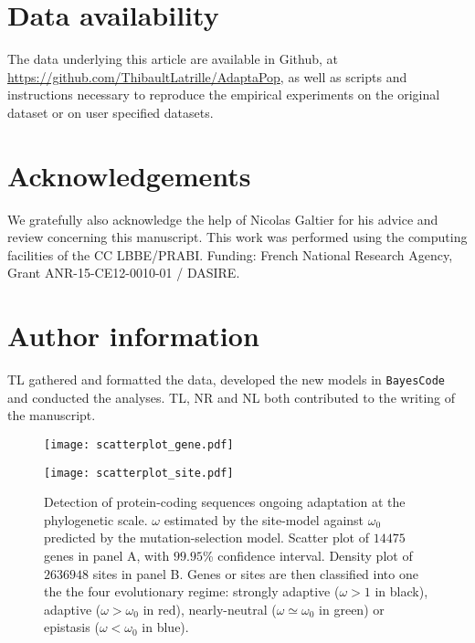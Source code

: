 \documentclass{article}
\begin{document}
\section{Data availability}
The data underlying this article are available in Github, at \url{https://github.com/ThibaultLatrille/AdaptaPop}, as well as scripts and instructions necessary to reproduce the empirical experiments on the original dataset or on user specified datasets.

\section{Acknowledgements}
We gratefully also acknowledge the help of Nicolas Galtier for his advice and review concerning this manuscript.
This work was performed using the computing facilities of the CC LBBE/PRABI.
Funding: French National Research Agency, Grant ANR-15-CE12-0010-01 / DASIRE.

\section{Author information}
TL gathered and formatted the data, developed the new models in \texttt{BayesCode} and conducted the analyses.
TL, NR and NL both contributed to the writing of the manuscript.

\printbibliography

\begin{figure*}[h!]
	\centering
	\begin{minipage}{0.49\linewidth}
		\texttt{[image: scatterplot\_gene.pdf]}
	\end{minipage}
	\hfill
	\begin{minipage}{0.49\linewidth}
		\texttt{[image: scatterplot\_site.pdf]}
	\end{minipage}
	\hfill
	\caption{
		Detection of protein-coding sequences ongoing adaptation at the phylogenetic scale.
		$\omega$ estimated by the site-model against $\omega_{0}$ predicted by the mutation-selection model.
		Scatter plot of $14475$ genes in panel A, with $99.95$\% confidence interval. Density plot of $2636948$ sites in panel B.
		Genes or sites are then classified into one the the four evolutionary regime: strongly adaptive ($\omega > 1$ in black), adaptive ($\omega > \omega_{0}$ in red), nearly-neutral ($\omega \simeq \omega_{0}$ in green) or epistasis ($\omega < \omega_{0}$ in blue).}
	\label{fig:scatterplot}
\end{figure*}
\end{document}
